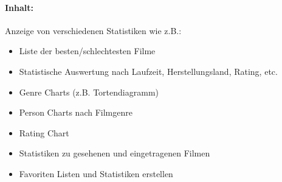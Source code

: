\paragraph{Inhalt:}
Anzeige von verschiedenen Statistiken wie z.B.:
\begin{itemize}
    \item Liste der besten/schlechtesten Filme
    \item Statistische Auswertung nach Laufzeit, Herstellungsland, Rating, etc.
    \item Genre Charts (z.B. Tortendiagramm)
    \item Person Charts nach Filmgenre
    \item Rating Chart
    \item Statistiken zu gesehenen und eingetragenen Filmen
    \item Favoriten Listen und Statistiken erstellen  
\end{itemize}
